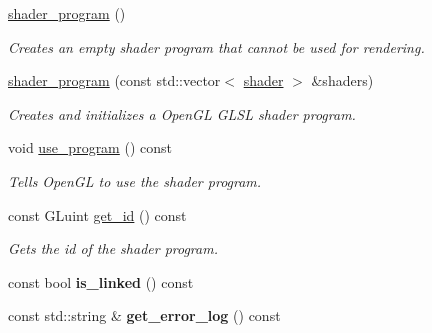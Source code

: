 \begin{DoxyCompactItemize}
\item 
\hyperlink{classoccluded_1_1opengl_1_1retained_1_1shaders_1_1shader__program_a940103083cf5b991c8de690748311dc3}{shader\+\_\+program} ()
\begin{DoxyCompactList}\small\item\em Creates an empty shader program that cannot be used for rendering. \end{DoxyCompactList}\item 
\hyperlink{classoccluded_1_1opengl_1_1retained_1_1shaders_1_1shader__program_ab866c58d6541142d873e0ec532fd194a}{shader\+\_\+program} (const std\+::vector$<$ \hyperlink{classoccluded_1_1opengl_1_1retained_1_1shaders_1_1shader}{shader} $>$ \&shaders)
\begin{DoxyCompactList}\small\item\em Creates and initializes a Open\+G\+L G\+L\+S\+L shader program. \end{DoxyCompactList}\item 
void \hyperlink{classoccluded_1_1opengl_1_1retained_1_1shaders_1_1shader__program_a92731484e3b37d25b3dc66a3a1871d2e}{use\+\_\+program} () const 
\begin{DoxyCompactList}\small\item\em Tells Open\+G\+L to use the shader program. \end{DoxyCompactList}\item 
const G\+Luint \hyperlink{classoccluded_1_1opengl_1_1retained_1_1shaders_1_1shader__program_a5824dc0a31ac6e1100cfa0677e309020}{get\+\_\+id} () const 
\begin{DoxyCompactList}\small\item\em Gets the id of the shader program. \end{DoxyCompactList}\item 
\hypertarget{classoccluded_1_1opengl_1_1retained_1_1shaders_1_1shader__program_af713d427fa3e7a05ccee96cee435a100}{const bool {\bfseries is\+\_\+linked} () const }\label{classoccluded_1_1opengl_1_1retained_1_1shaders_1_1shader__program_af713d427fa3e7a05ccee96cee435a100}

\item 
\hypertarget{classoccluded_1_1opengl_1_1retained_1_1shaders_1_1shader__program_af2eb6bffe5e771bf47013086ace9d16f}{const std\+::string \& {\bfseries get\+\_\+error\+\_\+log} () const }\label{classoccluded_1_1opengl_1_1retained_1_1shaders_1_1shader__program_af2eb6bffe5e771bf47013086ace9d16f}

\end{DoxyCompactItemize}


